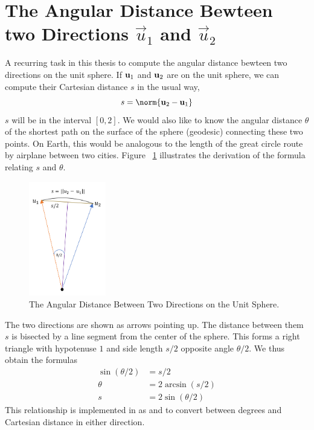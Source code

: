 \section{The Angular Distance Bewteen two Directions $\vec{u}_1$ and $\vec{u}_2$}
\label{section_ztf_angle_diff}
A recurring task in this thesis to compute the angular distance bewteen two directions on the unit sphere.
If $\mathbf{u}_1$ and $\mathbf{u}_2$ are on the unit sphere, we can compute their Cartesian distance $s$ in the usual way,
$$ s = \norm{\uvec_2 - \uvec_1}$$
$s$ will be in the interval $[0, 2]$.
We would also like to know the angular distance $\theta$ of the shortest path 
on the surface of the sphere (geodesic) connecting these two points.
On Earth, this would be analogous to the length of the great circle route by airplane between two cities.
Figure ~\ref{fig:ang_distance} illustrates the derivation of the formula relating $s$ and $\theta$.
\begin{figure}[hbt!]
\begin{center}
\includegraphics[width=0.3\textwidth]{../figs/misc/angular_distance.png}
\end{center}
\caption[The Angular Distance Between Two Directions on the Unit Sphere]
{The Angular Distance Between Two Directions on the Unit Sphere.}
\label{fig:ang_distance}
\end{figure}
The two directions are shown as arrows pointing up.
The distance between them $s$ is bisected by a line segment from the center of the sphere.
This forms a right triangle with hypotenuse $1$ and side length $s/2$ opposite angle $\theta/2$.
We thus obtain the formulas
\begin{align*}
\sin (\theta / 2) &= s / 2 \\ 
\theta &= 2 \arcsin (s / 2) \\
s &= 2 \sin (\theta / 2)
\end{align*}
This relationship is implemented in  as  and  to convert between degrees and Cartesian distance in either direction.

